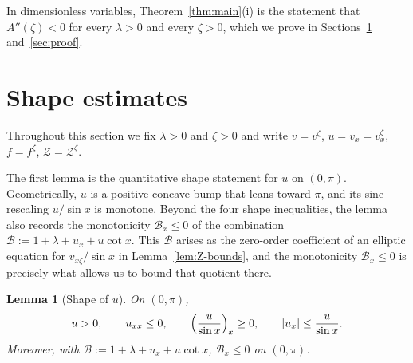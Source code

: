 \documentclass{amsart}
\newtheorem{lemma}[theorem]{Lemma}
\begin{document}
In dimensionless variables, Theorem~\ref{thm:main}(i) is the statement
that $A''(\zeta)<0$ for every $\lambda>0$ and every $\zeta>0$,
which we prove in Sections~\ref{sec:prelim}
and~\ref{sec:proof}.

\section{Shape estimates}\label{sec:prelim}

Throughout this section we fix $\lambda>0$ and $\zeta>0$ and write
$v=v^\zeta$, $u=v_x=v^\zeta_x$, $f=f^\zeta$,
$\mathcal Z=\mathcal Z^\zeta$.

The first lemma is the quantitative shape statement for $u$ on
$(0,\pi)$. Geometrically, $u$ is a positive concave bump that
leans toward $\pi$, and its sine-rescaling $u/\sin x$ is monotone. Beyond the four shape inequalities, the lemma also
records the monotonicity $\mathcal B_x\leq 0$ of the combination
$\mathcal B:=1+\lambda+u_x+u\cot x$. This $\mathcal B$ arises as the
zero-order coefficient of an elliptic equation for
$v_{x\zeta}/\sin x$ in Lemma~\ref{lem:Z-bounds}, and the monotonicity
$\mathcal B_x\leq 0$ is precisely what allows us to bound that
quotient there.
\begin{lemma}[Shape of $u$]\label{lem:u-shape}
On $(0,\pi)$,
\begin{equation}\label{eq:shape}
u>0,\qquad u_{xx}\leq 0,\qquad
\Bigl(\frac{u}{\sin x}\Bigr)_x\geq 0,\qquad
|u_x|\leq\frac{u}{\sin x}.
\end{equation}
Moreover, with $\mathcal B:=1+\lambda+u_x+u\cot x$, $\mathcal B_x\leq 0$ on
$(0,\pi)$.
\end{lemma}
\end{document}
